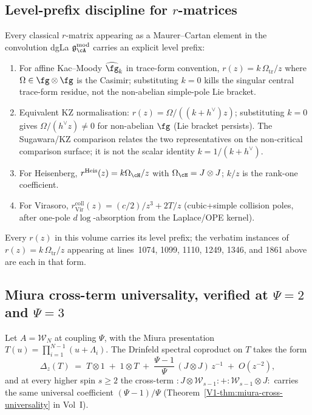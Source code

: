 \subsection{Level-prefix discipline for $r$-matrices}
\label{subsec:bar-cobar-review-rmatrix-level-prefix-discipline}

\begin{remark}
\label{rem:bar-cobar-review-rmatrix-level-prefix}
Every classical $r$-matrix appearing as a Maurer--Cartan element in
the convolution dgLa $\mathfrak{g}^{\mathrm{mod}}_\cA$ carries an
explicit level prefix:
\begin{enumerate}[label=\textup{(\roman*)}]
\item For affine Kac--Moody $\widehat\fg_k$ in trace-form
convention, $r(z) = k\,\Omega_{\mathrm{tr}}/z$ where $\Omega \in \fg\otimes\fg$ is
the Casimir; substituting $k=0$ kills the singular central
trace-form residue, not the non-abelian simple-pole Lie bracket.
\item Equivalent KZ normalisation: $r(z) = \Omega/((k+h^\vee)z)$;
substituting $k=0$ gives $\Omega/(h^\vee z)\ne 0$ for non-abelian
$\fg$ (Lie bracket persists). The Sugawara/KZ comparison relates the
two representatives on the non-critical comparison surface; it is not
the scalar identity \(k=1/(k+h^\vee)\).
\item For Heisenberg,
$r^{\mathrm{Heis}}(z)=k\Omega_{\cH}/z$ with
$\Omega_{\cH}=J\otimes J$; $k/z$ is the rank-one coefficient.
\item For Virasoro,
\(r_{\mathrm{Vir}}^{\mathrm{coll}}(z) = (c/2)/z^3 + 2T/z\)
(cubic+simple collision poles, after one-pole \(d\log\)-absorption
from the Laplace/OPE kernel).
\end{enumerate}
Every $r(z)$ in this volume carries its level prefix; the verbatim
instances of $r(z) = k\,\Omega_{\mathrm{tr}}/z$ appearing at lines~1074, 1099,
1110, 1249, 1346, and 1861 above are each in that form.
\end{remark}

\subsection{Miura cross-term universality, verified at $\Psi=2$ and
$\Psi=3$}
\label{subsec:bar-cobar-review-miura-cross-term}

\begin{proposition}
\label{prop:bar-cobar-review-miura-universality}
Let $A = \mathcal{W}_N$ at coupling $\Psi$, with the Miura presentation
$T(u) = \prod_{i=1}^{N-1}(u + \Lambda_i)$. The Drinfeld spectral
coproduct on $T$ takes the form
\[
\Delta_z(T) \;=\; T\otimes 1 \;+\; 1\otimes T \;+\;
\frac{\Psi-1}{\Psi}\,(J\otimes J)\,z^{-1} \;+\; O(z^{-2}),
\]
and at every higher spin $s\ge 2$ the cross-term
$:J\otimes \mathcal{W}_{s-1}: + :\mathcal{W}_{s-1}\otimes J:$ carries the
same universal coefficient $(\Psi-1)/\Psi$
(Theorem~\ref{V1-thm:miura-cross-universality} in Vol~I).
\end{proposition}

